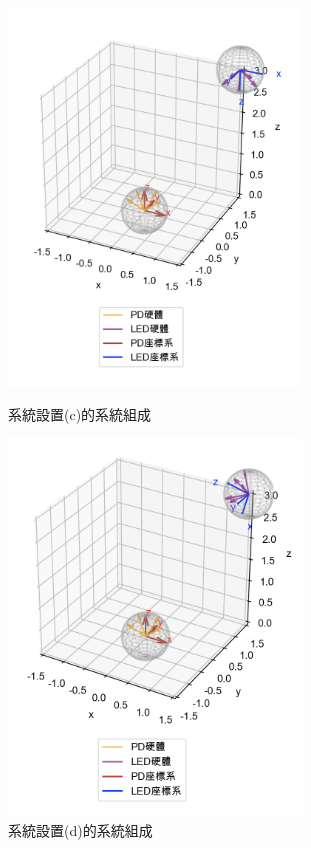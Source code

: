     \begin{figure}[htpb]
    \centering
    \begin{minipage}{.5\textwidth}
        \centering
        \includegraphics[height=10cm]{ch4pic/set_c.png}
        \caption{系統設置(c)的系統組成}
        \label{pic:set_c}
    \end{minipage}%
    \begin{minipage}{0.5\textwidth}
        \centering
        \includegraphics[height=10cm]{ch4pic/set_d.png}
        \caption{系統設置(d)的系統組成}
        \label{pic:set_d}
    \end{minipage}

    \end{figure}

